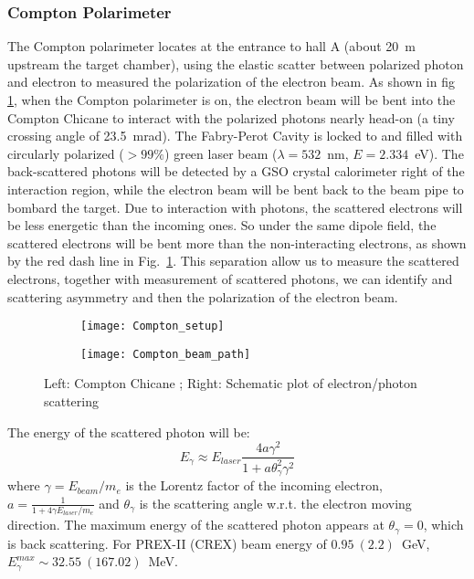 \subsubsection{Compton Polarimeter}
The Compton polarimeter locates at the entrance to hall A (about 20~m upstream the 
target chamber), using the elastic scatter between polarized photon and electron
to measured the polarization of the electron beam. As shown in fig \ref{fig:compton_pol},
when the Compton polarimeter is on, the electron beam will be bent into the 
Compton Chicane to interact with the polarized photons nearly head-on (a tiny
crossing angle of 23.5~mrad). The Fabry-Perot Cavity
is locked to and filled with circularly polarized ($> 99\%$) green laser beam
($\lambda = 532$~nm, $E = 2.334$~eV).
The back-scattered photons will be detected by a GSO crystal calorimeter right 
of the interaction region, while the
electron beam will be bent back to the beam pipe to bombard the target. Due to
interaction with photons, the scattered electrons will be less energetic than
the incoming ones. So under the same dipole field, the scattered electrons will
be bent more than the non-interacting electrons, as shown by the red dash line 
in Fig.~\ref{fig:compton_pol}. This 
separation allow us to measure the scattered electrons, together with measurement
of scattered photons, we can identify and scattering asymmetry and then the polarization
of the electron beam.
\begin{figure}[h!]
    \begin{subfigure}[c]{0.55\linewidth}
	\texttt{[image: Compton\_setup]}
    \end{subfigure}
    \begin{subfigure}[c]{0.55\linewidth}
	\texttt{[image: Compton\_beam\_path]}
    \end{subfigure}
    \caption{Left: Compton Chicane \cite{PhysRevSTAB.7.042802}; 
    Right: Schematic plot of electron/photon scattering} 
    \label{fig:compton_pol}
\end{figure}

The energy of the scattered photon will be:
\begin{equation}
    E_\gamma \approx E_{laser} \frac{4a\gamma^2}{1 + a\theta^2_\gamma \gamma^2}
\end{equation}
where $\gamma = E_{beam}/m_e$ is the Lorentz factor of the incoming electron, 
$a = \frac{1}{1 + 4\gamma E_{laser}/m_e}$ and $\theta_\gamma$ is the scattering
angle w.r.t. the electron moving direction. The maximum energy of the scattered
photon appears at $\theta_\gamma = 0$, which is back scattering. 
For PREX-II (CREX) beam energy of $0.95\ (2.2)$~GeV, $E_\gamma^{max} \sim 32.55 \ (167.02)$~MeV.

